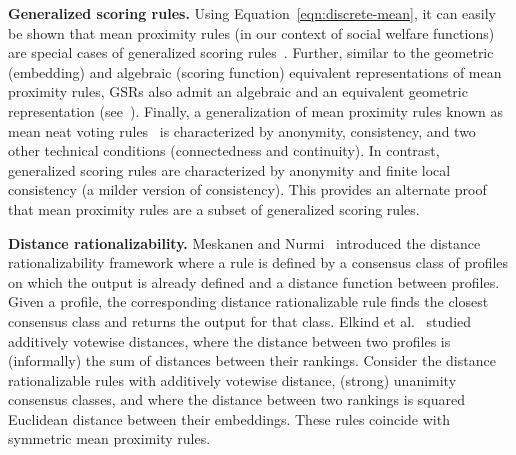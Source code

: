 \documentclass[prodmode,acmec]{ec-acmsmall}
\begin{document}
\medskip 
\noindent \textbf{Generalized scoring rules.} Using Equation~\eqref{eqn:discrete-mean}, it can easily be shown that mean proximity rules (in our context of social welfare functions) are special cases of generalized scoring rules~\cite{XC08}. Further, similar to the geometric (embedding) and algebraic (scoring function) equivalent representations of mean proximity rules, GSRs also admit an algebraic and an equivalent geometric representation (see~\cite{MPR12b}). Finally, a generalization of mean proximity rules known as mean neat voting rules~\cite{Zwicker08b} is characterized by anonymity, consistency, and two other technical conditions (connectedness and continuity). In contrast, generalized scoring rules are characterized by anonymity and finite local consistency (a milder version of consistency). This provides an alternate proof that mean proximity rules are a subset of generalized scoring rules. 

\medskip
\noindent \textbf{Distance rationalizability.} Meskanen and Nurmi~ introduced the distance rationalizability framework where a rule is defined by a consensus class of profiles on which the output is already defined and a distance function between profiles. Given a profile, the corresponding distance rationalizable rule finds the closest consensus class and returns the output for that class. Elkind et al.~ studied additively votewise distances, where the distance between two profiles is (informally) the sum of distances between their rankings. Consider the distance rationalizable rules with additively votewise distance, (strong) unanimity consensus classes, and where the distance between two rankings is squared Euclidean distance between their embeddings. These rules coincide with symmetric mean proximity rules. 

\end{document}
